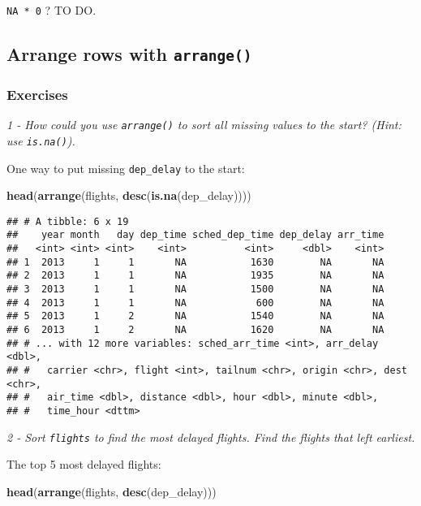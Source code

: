 \documentclass[]{article}
\newenvironment{Shaded}{\begin{snugshade}}{\end{snugshade}}
\newcommand{\KeywordTok}[1]{\textcolor[rgb]{0.13,0.29,0.53}{\textbf{#1}}}
\newcommand{\NormalTok}[1]{#1}
\theoremstyle{definition}
\theoremstyle{definition}
\theoremstyle{definition}
\theoremstyle{remark}
\begin{document}
\texttt{NA\ *\ 0} ? TO DO.

\subsection{\texorpdfstring{Arrange rows with
\texttt{arrange()}}{Arrange rows with arrange()}}\label{arrange-rows-with-arrange}

\subsubsection{Exercises}\label{exercises-8}

\emph{1 - How could you use \texttt{arrange()} to sort all missing
values to the start? (Hint: use \texttt{is.na()}).}

One way to put missing \texttt{dep\_delay} to the start:

\begin{Shaded}
\begin{Highlighting}[]
\KeywordTok{head}\NormalTok{(}\KeywordTok{arrange}\NormalTok{(flights, }\KeywordTok{desc}\NormalTok{(}\KeywordTok{is.na}\NormalTok{(dep_delay))))}
\end{Highlighting}
\end{Shaded}

\begin{verbatim}
## # A tibble: 6 x 19
##    year month   day dep_time sched_dep_time dep_delay arr_time
##   <int> <int> <int>    <int>          <int>     <dbl>    <int>
## 1  2013     1     1       NA           1630        NA       NA
## 2  2013     1     1       NA           1935        NA       NA
## 3  2013     1     1       NA           1500        NA       NA
## 4  2013     1     1       NA            600        NA       NA
## 5  2013     1     2       NA           1540        NA       NA
## 6  2013     1     2       NA           1620        NA       NA
## # ... with 12 more variables: sched_arr_time <int>, arr_delay <dbl>,
## #   carrier <chr>, flight <int>, tailnum <chr>, origin <chr>, dest <chr>,
## #   air_time <dbl>, distance <dbl>, hour <dbl>, minute <dbl>,
## #   time_hour <dttm>
\end{verbatim}

\emph{2 - Sort \texttt{flights} to find the most delayed flights. Find
the flights that left earliest.}

The top 5 most delayed flights:

\begin{Shaded}
\begin{Highlighting}[]
\KeywordTok{head}\NormalTok{(}\KeywordTok{arrange}\NormalTok{(flights, }\KeywordTok{desc}\NormalTok{(dep_delay)))}
\end{Highlighting}
\end{Shaded}
\end{document}
